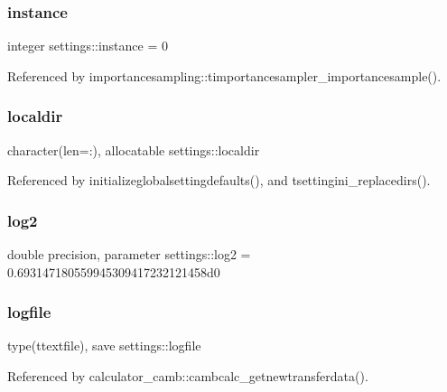 \mbox{\label{namespacesettings_a8b396bca0192e0a92363a9cf6b942542}} 
\subsubsection{\texorpdfstring{instance}{instance}}
{\footnotesize\ttfamily integer settings\+::instance = 0}



Referenced by importancesampling\+::timportancesampler\+\_\+importancesample().

\mbox{\label{namespacesettings_a464bacc2f6a7b48655e92110d990d457}} 
\subsubsection{\texorpdfstring{localdir}{localdir}}
{\footnotesize\ttfamily character(len=\+:), allocatable settings\+::localdir}



Referenced by initializeglobalsettingdefaults(), and tsettingini\+\_\+replacedirs().

\mbox{\label{namespacesettings_a9020a6ca0bbe74043ff8103f9f8ece1d}} 
\subsubsection{\texorpdfstring{log2}{log2}}
{\footnotesize\ttfamily double precision, parameter settings\+::log2 = 0.\+693147180559945309417232121458d0}

\mbox{\label{namespacesettings_abf81803341f16be48aa42058423f085b}} 
\subsubsection{\texorpdfstring{logfile}{logfile}}
{\footnotesize\ttfamily type(ttextfile), save settings\+::logfile}



Referenced by calculator\+\_\+camb\+::cambcalc\+\_\+getnewtransferdata().

